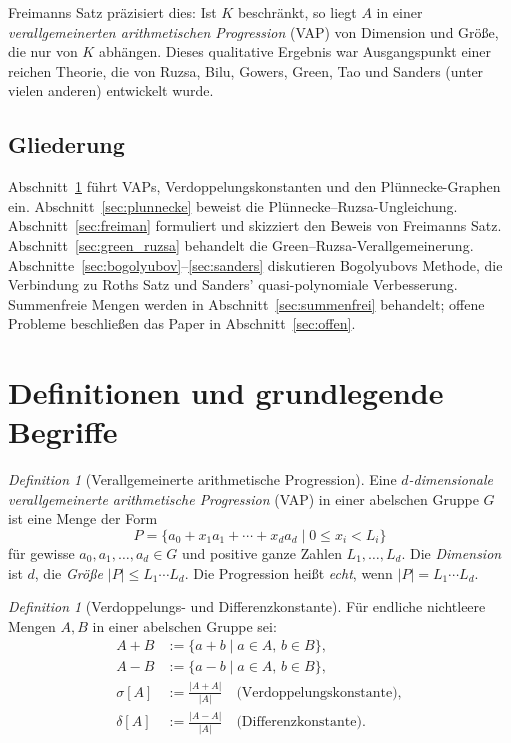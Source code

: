\documentclass[12pt,a4paper]{amsart}
\theoremstyle{definition}
\theoremstyle{remark}
\newtheorem{definition_de}[theorem]{Definition}
\begin{document}
Freimanns Satz \cite{Freiman1966} präzisiert dies: Ist $K$ beschränkt, so liegt $A$
in einer \emph{verallgemeinerten arithmetischen Progression} (VAP) von Dimension
und Größe, die nur von $K$ abhängen. Dieses qualitative Ergebnis war Ausgangspunkt
einer reichen Theorie, die von Ruzsa, Bilu, Gowers, Green, Tao und Sanders (unter
vielen anderen) entwickelt wurde.

\subsection{Gliederung}

Abschnitt~\ref{sec:def} führt VAPs, Verdoppelungskonstanten und den
Plünnecke-Graphen ein. Abschnitt~\ref{sec:plunnecke} beweist die
Plünnecke--Ruzsa-Ungleichung. Abschnitt~\ref{sec:freiman} formuliert und skizziert
den Beweis von Freimanns Satz. Abschnitt~\ref{sec:green_ruzsa} behandelt die
Green--Ruzsa-Verallgemeinerung. Abschnitte~\ref{sec:bogolyubov}--\ref{sec:sanders}
diskutieren Bogolyubovs Methode, die Verbindung zu Roths Satz und Sanders'
quasi-polynomiale Verbesserung. Summenfreie Mengen werden in
Abschnitt~\ref{sec:summenfrei} behandelt; offene Probleme beschließen das Paper
in Abschnitt~\ref{sec:offen}.

\section{Definitionen und grundlegende Begriffe}\label{sec:def}

\begin{definition_de}[Verallgemeinerte arithmetische Progression]
Eine \emph{$d$-dimensionale verallgemeinerte arithmetische Progression} (VAP)
in einer abelschen Gruppe $G$ ist eine Menge der Form
\[
  P = \{a_0 + x_1 a_1 + \cdots + x_d a_d \mid 0 \leq x_i < L_i\}
\]
für gewisse $a_0, a_1, \ldots, a_d \in G$ und positive ganze Zahlen
$L_1, \ldots, L_d$. Die \emph{Dimension} ist $d$, die \emph{Größe}
$|P| \leq L_1 \cdots L_d$. Die Progression heißt \emph{echt}, wenn
$|P| = L_1 \cdots L_d$.
\end{definition_de}

\begin{definition_de}[Verdoppelungs- und Differenzkonstante]
Für endliche nichtleere Mengen $A, B$ in einer abelschen Gruppe sei:
\begin{align*}
  A + B &:= \{a + b \mid a \in A,\, b \in B\}, \\
  A - B &:= \{a - b \mid a \in A,\, b \in B\}, \\
  \sigma[A] &:= \frac{|A + A|}{|A|} \quad \text{(Verdoppelungskonstante)}, \\
  \delta[A] &:= \frac{|A - A|}{|A|} \quad \text{(Differenzkonstante)}.
\end{align*}
\end{definition_de}
\end{document}
